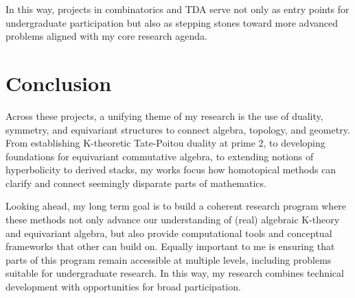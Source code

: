 \documentclass[11pt]{article}
\begin{document}
In this way, projects in combinatorics and TDA serve not only as entry points for undergraduate participation but also as stepping stones toward more advanced problems aligned with my core research agenda.

\section{Conclusion}
Across these projects, a unifying theme of my research is the use of duality, symmetry, and equivariant structures to connect algebra, topology, and geometry.
From establishing K-theoretic Tate-Poitou duality at prime 2, to developing foundations for equivariant commutative algebra, to extending notions of hyperbolicity to derived stacks, my works focus how homotopical methods can clarify and connect seemingly disparate parts of mathematics.

Looking ahead, my long term goal is to build a coherent research program where these methods not only advance our understanding of (real) algebraic K-theory and equivariant algebra, but also provide computational tools and conceptual frameworks that other can build on.
Equally important to me is ensuring that parts of this program remain accessible at multiple levels, including problems suitable for undergraduate research.
In this way, my research combines technical development with opportunities for broad participation.



\end{document}
